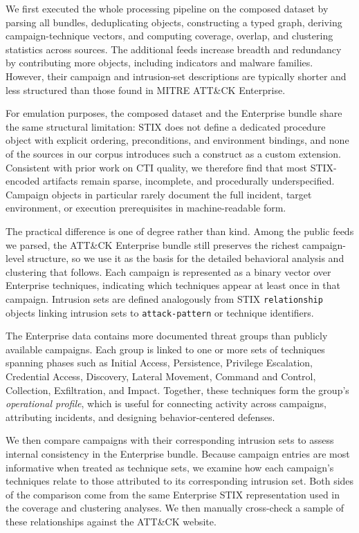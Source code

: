 \documentclass[sigconf]{acmart}
\newcommand{\stix}{STIX\xspace}
\newcommand{\mitre}{MITRE\xspace}
\newcommand{\attack}{ATT\&CK\xspace}
\begin{document}
We first executed the whole processing pipeline on the composed dataset by parsing all bundles, deduplicating objects, constructing a typed graph, deriving campaign-technique vectors, and computing coverage, overlap, and clustering statistics across sources. The additional feeds increase breadth and redundancy by contributing more objects, including indicators and malware families. However, their campaign and intrusion-set descriptions are typically shorter and less structured than those found in \mitre{} \attack{} Enterprise.

For emulation purposes, the composed dataset and the Enterprise bundle share the same structural limitation: \stix{} does not define a dedicated procedure object with explicit ordering, preconditions, and environment bindings, and none of the sources in our corpus introduces such a construct as a custom extension. Consistent with prior work on CTI quality, we therefore find that most \stix{}-encoded artifacts remain sparse, incomplete, and procedurally underspecified. Campaign objects in particular rarely document the full incident, target environment, or execution prerequisites in machine-readable form.

The practical difference is one of degree rather than kind. Among the public feeds we parsed, the \attack{} Enterprise bundle still preserves the richest campaign-level structure, so we use it as the basis for the detailed behavioral analysis and clustering that follows. Each campaign is represented as a binary vector over Enterprise techniques, indicating which techniques appear at least once in that campaign. Intrusion sets are defined analogously from \stix{} \texttt{relationship} objects linking intrusion sets to \texttt{attack-pattern} or technique identifiers.

The Enterprise data contains more documented threat groups than publicly available campaigns. Each group is linked to one or more sets of techniques spanning phases such as Initial Access, Persistence, Privilege Escalation, Credential Access, Discovery, Lateral Movement, Command and Control, Collection, Exfiltration, and Impact. Together, these techniques form the group’s \emph{operational profile}, which is useful for connecting activity across campaigns, attributing incidents, and designing behavior-centered defenses.

We then compare campaigns with their corresponding intrusion sets to assess internal consistency in the Enterprise bundle. Because campaign entries are most informative when treated as technique sets, we examine how each campaign’s techniques relate to those attributed to its corresponding intrusion set. Both sides of the comparison come from the same Enterprise \stix{} representation used in the coverage and clustering analyses. We then manually cross-check a sample of these relationships against the \attack{} website.
\end{document}
